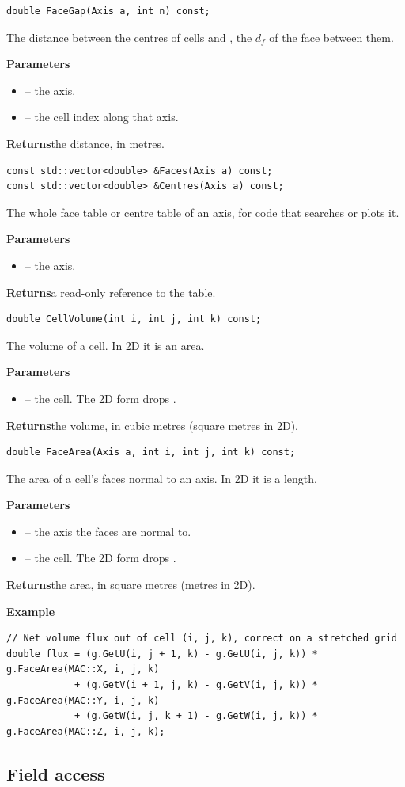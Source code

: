 \documentclass[10pt,a4paper]{article}
\newcommand{\code}[1]{\texttt{\detokenize{#1}}}
\newenvironment{params}{\par\noindent\textbf{Parameters}\begin{itemize}[leftmargin=1.4em,itemsep=0pt,topsep=1pt,parsep=0pt]}{\end{itemize}}
\newcommand{\p}[2]{\item \code{#1} -- #2}
\newcommand{\returns}[1]{\par\noindent\textbf{Returns}\quad #1\par}
\newcommand{\example}{\par\smallskip\noindent\textbf{Example}\par}
\begin{document}
\begin{lstlisting}[style=sig]
double FaceGap(Axis a, int n) const;
\end{lstlisting}
The distance between the centres of cells \code{n} and \code{n+1}, the $d_f$ of the face between them.
\begin{params}
\p{a}{the axis.}
\p{n}{the cell index along that axis.}
\end{params}
\returns{the distance, in metres.}

\begin{lstlisting}[style=sig]
const std::vector<double> &Faces(Axis a) const;
const std::vector<double> &Centres(Axis a) const;
\end{lstlisting}
The whole face table or centre table of an axis, for code that searches or plots it.
\begin{params}
\p{a}{the axis.}
\end{params}
\returns{a read-only reference to the table.}

\begin{lstlisting}[style=sig]
double CellVolume(int i, int j, int k) const;
\end{lstlisting}
The volume of a cell. In 2D it is an area.
\begin{params}
\p{i, j, k}{the cell. The 2D form drops \code{k}.}
\end{params}
\returns{the volume, in cubic metres (square metres in 2D).}

\begin{lstlisting}[style=sig]
double FaceArea(Axis a, int i, int j, int k) const;
\end{lstlisting}
The area of a cell's faces normal to an axis. In 2D it is a length.
\begin{params}
\p{a}{the axis the faces are normal to.}
\p{i, j, k}{the cell. The 2D form drops \code{k}.}
\end{params}
\returns{the area, in square metres (metres in 2D).}
\example
\begin{lstlisting}[style=ex]
// Net volume flux out of cell (i, j, k), correct on a stretched grid
double flux = (g.GetU(i, j + 1, k) - g.GetU(i, j, k)) * g.FaceArea(MAC::X, i, j, k)
            + (g.GetV(i + 1, j, k) - g.GetV(i, j, k)) * g.FaceArea(MAC::Y, i, j, k)
            + (g.GetW(i, j, k + 1) - g.GetW(i, j, k)) * g.FaceArea(MAC::Z, i, j, k);
\end{lstlisting}

\subsection{Field access}
\end{document}
